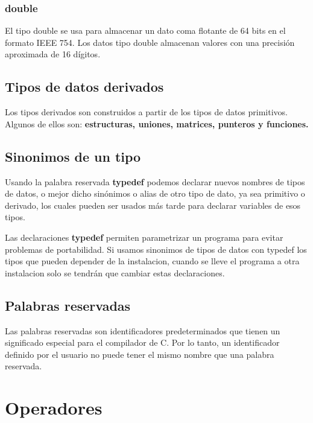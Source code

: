 \documentclass[]{article}
\begin{document}
\subsubsection{double}
El tipo double se usa para almacenar un dato coma flotante de 64 bits en el formato IEEE 754. Los datos tipo double almacenan valores con una precisión aproximada de 16 dígitos.

\subsection{Tipos de datos derivados}
Los tipos derivados son construidos a partir de los tipos de datos primitivos. Algunos de ellos son: \textbf{estructuras, uniones, matrices, punteros y funciones.}

\subsection{Sinonimos de un tipo}
Usando la palabra reservada \textbf{typedef} podemos declarar nuevos nombres de tipos de datos, o mejor dicho sinónimos o alias de otro tipo de dato, ya sea primitivo o derivado, los cuales pueden ser usados más tarde para declarar variables de esos tipos.

Las declaraciones \textbf{typedef} permiten parametrizar un programa para evitar problemas de portabilidad. Si usamos sinonimos de tipos de datos con typedef los tipos que pueden depender de la instalacion, cuando se lleve el programa a otra instalacion solo se tendrán que cambiar estas declaraciones.

\subsection{Palabras reservadas}
Las palabras reservadas son identificadores predeterminados que tienen un significado especial para el compilador de C. Por lo tanto, un identificador definido por el usuario no puede tener el mismo nombre que una palabra reservada.

\pagebreak
\section{Operadores}
\end{document}
